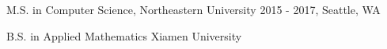 


\begin{cventries}


%


\verycompactcventry
{M.S. in Computer Science, Northeastern University} %
{2015 - 2017, Seattle, WA} %

\verycompactcventry
{B.S. in Applied Mathematics} %
{Xiamen University} %

\end{cventries}